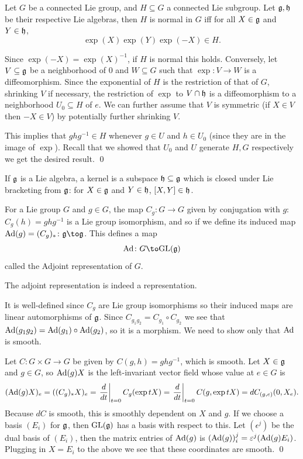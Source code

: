 \blemm

    Let $G$ be a connected Lie group, and $H\subseteq G$ a connected Lie subgroup.
    Let ${{\frak g}},{{\frak h}}$ be their respective Lie algebras, then $H$ is normal in $G$ iff for all $X\in{{\frak g}}$ and $Y\in{{\frak h}}$,
    $$ \exp(X)\exp(Y)\exp(-X) \in H . $$

\elemm

\bproof

    Since $\exp(-X)=\exp(X)^{-1}$, if $H$ is normal this holds.
    Conversely, let $V\subseteq{{\frak g}}$ be a neighborhood of $0$ and $W\subseteq G$ such that $\exp\colon V\to W$ is a diffeomorphism.
    Since the exponential of $H$ is the restriction of that of $G$, shrinking $V$ if necessary, the restriction of $\exp$ to $V\cap{{\frak h}}$
    is a diffeomorphism to a neighborhood $U_0\subseteq H$ of $e$.
    We can further assume that $V$ is symmetric (if $X\in V$ then $-X\in V$) by potentially further shrinking $V$.

    This implies that $ghg^{-1}\in H$ whenever $g\in U$ and $h\in U_0$ (since they are in the image of $\exp$).
    Recall that we showed that $U_0$ and $U$ generate $H,G$ respectively we get the desired result.
    \qed

\eproof

\bdefn

    If ${{\frak g}}$ is a Lie algebra, a {\emphcolor kernel} is a subspace ${{\frak h}}\subseteq{{\frak g}}$ which is closed under Lie bracketing from ${{\frak g}}$:
    for $X\in{{\frak g}}$ and $Y\in{{\frak h}}$, $[X,Y]\in{{\frak h}}$.

\edefn

For a Lie group $G$ and $g\in G$, the map $C_g\colon G\to G$ given by conjugation with $g$: $C_g(h)=ghg^{-1}$ is a Lie group
isomorphism, and so if we define its induced map $\Ad(g)=(C_g)_*\colon\g\to\g$.
This defines a map
$$ \Ad\colon G\to\gl(\g) $$
called the {\emphcolor Adjoint representation} of $G$.

\bprop

    The adjoint representation is indeed a representation.

\eprop

\bproof

    It is well-defined since $C_g$ are Lie group isomorphisms so their induced maps are linear automorphisms of ${{\frak g}}$.
    Since $C_{g_1g_2}=C_{g_1}\circ C_{g_2}$ we see that ${\rm Ad}(g_1g_2)={\rm Ad}(g_1)\circ{\rm Ad}(g_2)$, so it is a morphism.
    We need to show only that ${\rm Ad}$ is smooth.

    Let $C\colon G\times G\to G$ be given by $C(g,h)=ghg^{-1}$, which is smooth.
    Let $X\in{{\frak g}}$ and $g\in G$, so ${\rm Ad}(g)X$ is the left-invariant vector field whose value at $e\in G$ is
    $$ ({\rm Ad}(g)X)_e = ((C_g)_*X)_e = \left.{{d}\over{dt}}\right|_{t=0}C_g(\exp tX) = \left.{{d}\over{dt}}\right|_{t=0}C(g,\exp tX) = dC_{(g,e)}(0,X_e) . $$
    Because $dC$ is smooth, this is smoothly dependent on $X$ and $g$.
    If we choose a basis $(E_i)$ for ${{\frak g}}$, then ${\rm GL}({{\frak g}})$ has a basis with respect to this.
    Let $(\epsilon^j)$ be the dual basis of $(E_i)$, then the matrix entries of ${\rm Ad}(g)$ is $({\rm Ad}(g))^j_i=\varepsilon^j({\rm Ad}(g)E_i)$.
    Plugging in $X=E_i$ to the above we see that these coordinates are smooth.
    \qed

